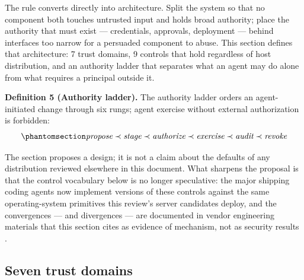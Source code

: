 \documentclass[
  english,
  9pt,
]{extarticle}
\begin{document}
The rule converts directly into architecture. Split the system so that
no component both touches untrusted input and holds broad authority;
place the authority that must exist --- credentials, approvals,
deployment --- behind interfaces too narrow for a persuaded component to
abuse. This section defines that architecture: 7 trust domains, 9
controls that hold regardless of host distribution, and an authority
ladder that separates what an agent may do alone from what requires a
principal outside it.

\protect{}\label{def:authority_ladder_order}
\textbf{Definition 5 (Authority ladder).} The authority ladder orders an
agent-initiated change through six rungs; agent exercise without
external authorization is forbidden:
\begin{equation}\protect\phantomsection\label{eq:authority_ladder_order}{\textit{propose} \prec \textit{stage} \prec \textit{authorize} \prec \textit{exercise} \prec \textit{audit} \prec \textit{revoke}}\end{equation}

The section proposes a design; it is not a claim about the defaults of
any distribution reviewed elsewhere in this document. What sharpens the
proposal is that the control vocabulary below is no longer speculative:
the major shipping coding agents now implement versions of these
controls against the same operating-system primitives this review's
server candidates deploy, and the convergences --- and divergences ---
are documented in vendor engineering materials that this section cites
as evidence of mechanism, not as security results
\citep{anthropic_sandboxing, codex_sandboxing}.

\subsection{Seven trust domains}\label{seven-trust-domains}
\end{document}
